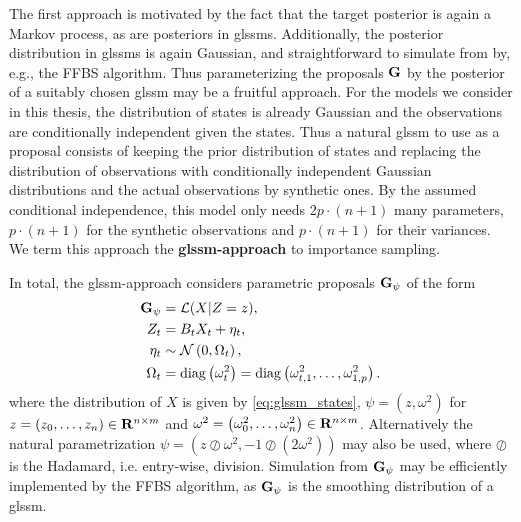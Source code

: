 The first approach  is motivated by the fact that the target posterior is again a Markov process, as are posteriors in \glspl{glssm}. Additionally, the posterior distribution in \gls{glssm}s is again Gaussian, and straightforward to simulate from by, e.g., the FFBS  algorithm. Thus parameterizing the proposals $\mathbf G$ by the posterior of a suitably chosen \gls{glssm} may be a fruitful approach.
For the models we consider in this thesis, the distribution of states is already Gaussian and the observations are conditionally independent given the states. Thus a natural \gls{glssm} to use as a proposal consists of keeping the prior distribution of states and replacing the distribution of observations with conditionally independent Gaussian distributions and the actual observations by synthetic ones. By the assumed conditional independence, this model only needs $2 p\cdot (n + 1)$ many parameters, $p\cdot (n + 1)$ for the synthetic observations and $p\cdot (n + 1)$ for their variances. We term this approach the \textbf{\gls{glssm}-approach} to importance sampling.

In total, the \gls{glssm}-approach considers parametric proposals $\mathbf G_{\psi}$ of the form
\begin{align}
    \begin{split}
    \label{eq:glssm-proposal}
    \mathbf G_{\psi} &= \mathcal L(X | Z = z),\\
    Z_{t} &= B_{t} X_{t} + \eta_{t},\\
    \eta_{t} &\sim \mathcal N \left( 0, \Omega_{t} \right),\\
    \Omega_{t} &= \operatorname{diag} \left( \omega^{2}_{t} \right) = \operatorname{diag} \left( \omega^{2}_{t,1}, \dots, \omega^{2}_{1,p} \right).
    \end{split}
\end{align}
where the distribution of $X$ is given by \eqref{eq:glssm_states}, $\psi = \left( z, \omega^{2} \right)$ for $z = \left( z_{0}, \dots, z_{n} \right) \in \mathbf R^{n \times m}$ and $\omega^{2} = \left( \omega^{2}_{0}, \dots, \omega^{2}_{n} \right) \in \mathbf R^{n \times m}$. Alternatively the natural parametrization $\psi = \left( z \oslash \omega^{2}, - 1 \oslash \left( 2 \omega^{2} \right) \right)$ may also be used, where $\oslash$ is the Hadamard, i.e. entry-wise, division. Simulation from $\mathbf G_{\psi}$ may be efficiently implemented by the FFBS algorithm, as $\mathbf G_{\psi}$ is the smoothing distribution of a \gls{glssm}. 

